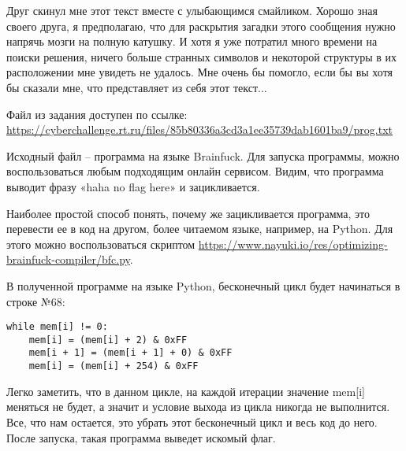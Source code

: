 
Друг скинул мне этот текст вместе с улыбающимся смайликом. Хорошо зная своего друга, я предполагаю, что для раскрытия загадки этого сообщения нужно напрячь мозги на полную катушку. И хотя я уже потратил много времени на поиски решения, ничего больше странных символов и некоторой структуры в их расположении мне увидеть не удалось. Мне очень бы помогло, если бы вы хотя бы сказали мне, что представляет из себя этот текст...

Файл из задания доступен по ссылке: \url{https://cyberchallenge.rt.ru/files/85b80336a3cd3a1ee35739dab1601ba9/prog.txt}

\solutionSection

Исходный файл – программа на языке Brainfuck. Для запуска программы, можно воспользоваться любым подходящим онлайн сервисом. Видим, что программа выводит фразу «haha no flag here» и зацикливается.

Наиболее простой способ понять, почему же зацикливается программа, это перевести ее в код на другом, более читаемом языке, например, на Python. Для этого можно воспользоваться скриптом \url{https://www.nayuki.io/res/optimizing-brainfuck-compiler/bfc.py}.

В полученной программе на языке Python, бесконечный цикл будет начинаться в строке №68:

\begin{verbatim}
while mem[i] != 0:
    mem[i] = (mem[i] + 2) & 0xFF
    mem[i + 1] = (mem[i + 1] + 0) & 0xFF
    mem[i] = (mem[i] + 254) & 0xFF
\end{verbatim}

Легко заметить, что в данном цикле, на каждой итерации значение mem[i] меняться не будет, а значит и условие выхода из цикла никогда не выполнится. Все, что нам остается, это убрать этот бесконечный цикл и весь код до него. После запуска, такая программа выведет искомый флаг.


